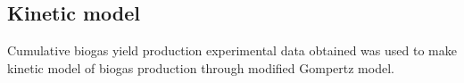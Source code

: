\subsection{Kinetic model}
Cumulative biogas yield production experimental data obtained was used to make kinetic model of biogas production through modified Gompertz model.